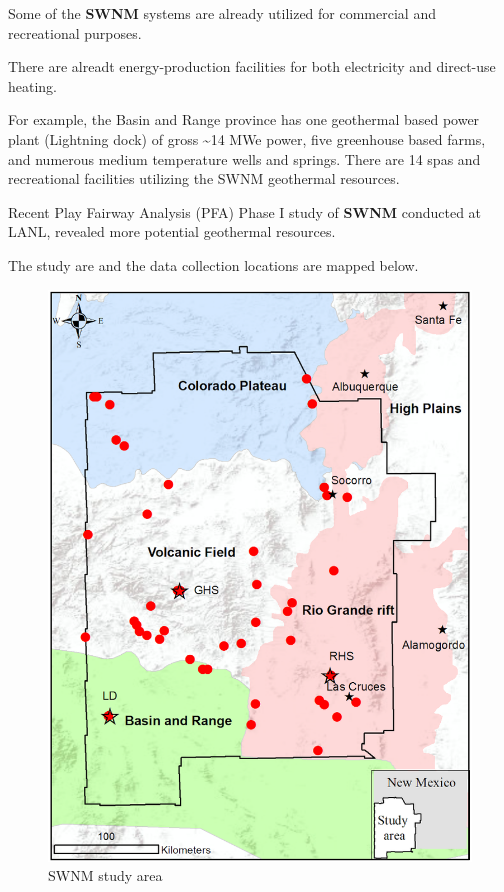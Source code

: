 \documentclass[11pt]{article}
\begin{document}
Some of the \textbf{SWNM} systems are already utilized for commercial
and recreational purposes.

There are alreadt energy-production facilities for both electricity and
direct-use heating.

For example, the Basin and Range province has one geothermal based power
plant (Lightning dock) of gross \textasciitilde14 MWe power, five
greenhouse based farms, and numerous medium temperature wells and
springs. There are 14 spas and recreational facilities utilizing the
SWNM geothermal resources.

Recent Play Fairway Analysis (PFA) Phase I study of \textbf{SWNM}
conducted at LANL, revealed more potential geothermal resources.

The study are and the data collection locations are mapped below.

\begin{figure}
\centering
\includegraphics{../map/SWNM_study_area.png}
\caption{SWNM study area}
\end{figure}
\end{document}
